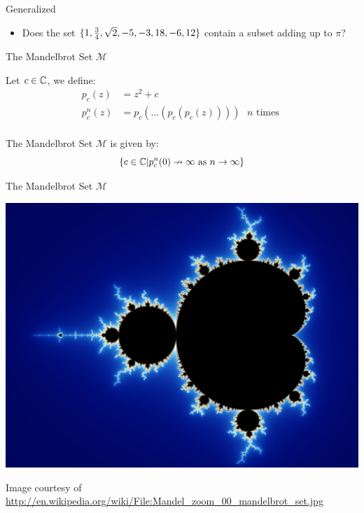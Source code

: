 \documentclass[c]{beamer}
\begin{document}
\begin{frame}{\subsum{} Generalized}
  
  \begin{itemize}
  \item[] Does the set $\{1,\frac{3}{4},\sqrt{2},-5,-3,18,-6,12\}$
    contain a subset adding up to $\pi$?
  \end{itemize}
\end{frame}

\begin{frame}{The Mandelbrot Set $\mathcal{M}$}
  
  Let $c \in \mathbb{C}$, we define:
    \begin{align*}
      p_c(z) &= z^2 + c\\
      p_c^n(z) &= p_c(\ldots(p_c(p_c(z)))) \text{ $n$ times }\\
    \end{align*}
    
    \vspace{-\baselineskip}
    
    The Mandelbrot Set $\mathcal{M}$ is given by:
    $$\{c \in \mathbb{C} |p_c^n(0) \nrightarrow \infty \text{ as } n \rightarrow \infty\}$$
    
\end{frame}

\begin{frame}{The Mandelbrot Set $\mathcal{M}$}

  \includegraphics[width=\textwidth]{media/mandelbrot.jpg}
  
  \tiny

  \vspace{-\baselineskip}

  Image courtesy of
  \url{http://en.wikipedia.org/wiki/File:Mandel_zoom_00_mandelbrot_set.jpg}
\end{frame}
\end{document}
